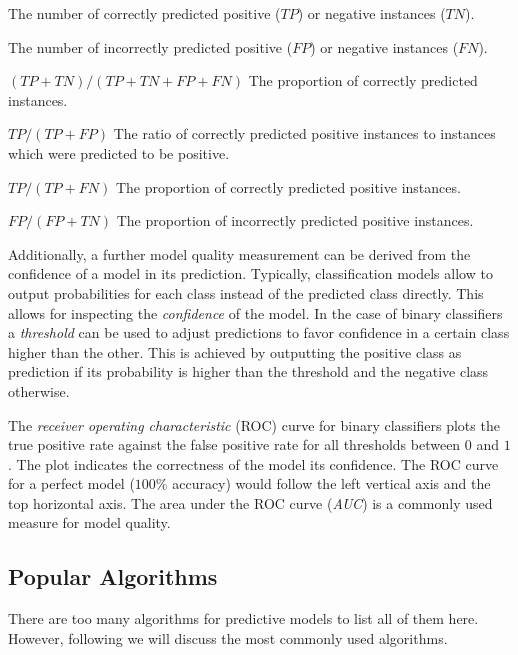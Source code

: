 \begin{description}[noitemsep]
    \item[True Positive / Negative]
    The number of correctly predicted positive ($TP$) or negative instances ($TN$).
    \item[False Positive / Negative]
    The number of incorrectly predicted positive ($FP$) or negative instances ($FN$).
    \item[Accuracy]
    $(TP + TN) / (TP + TN + FP + FN)$ The proportion of correctly predicted instances.
    \item[Precision]
    $TP / (TP + FP)$ The ratio of correctly predicted positive instances to instances which were predicted to be positive.
    \item[True Positive Rate / Recall]
    $TP / (TP + FN)$ The proportion of correctly predicted positive instances.
    \item[False Positive Rate]
    $FP / (FP + TN)$ The proportion of incorrectly predicted positive instances.
\end{description}

Additionally, a further model quality measurement can be derived from the confidence of a model in its prediction.
Typically, classification models allow to output probabilities for each class instead of the predicted class directly.
This allows for inspecting the \emph{confidence} of the model.
In the case of binary classifiers a \emph{threshold} can be used to adjust predictions to favor confidence in a certain class higher than the other.
This is achieved by outputting the positive class as prediction if its probability is higher than the threshold and the negative class otherwise.



The \emph{receiver operating characteristic} (ROC) curve for binary classifiers plots the true positive rate against the false positive rate for all thresholds between $0$ and $1$.
The plot indicates the correctness of the model \wrt its confidence.
The ROC curve for a perfect model ($100\%$ accuracy) would follow the left vertical axis and the top horizontal axis.
The area under the ROC curve (\emph{AUC}) is a commonly used measure for model quality. 

\subsection{Popular Algorithms}
There are too many algorithms for predictive models to list all of them here.
However, following we will discuss the most commonly used algorithms.

